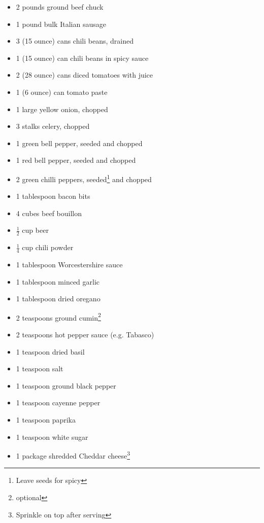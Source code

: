 \documentclass[12pt]{article}
\begin{document}
\vspace{-3cm}
\begin{itemize}
  \item 2 pounds ground beef chuck 
  \item 1 pound bulk Italian sausage 
  \item 3 (15 ounce) cans chili beans, drained 
  \item 1 (15 ounce) can chili beans in spicy sauce 
  \item 2 (28 ounce) cans diced tomatoes with juice 
  \item 1 (6 ounce) can tomato paste 
  \item 1 large yellow onion, chopped 
  \item 3 stalks celery, chopped 
  \item 1 green bell pepper, seeded and chopped 
  \item 1 red bell pepper, seeded and chopped 
  \item 2 green chilli peppers, seeded\footnote{Leave seeds for spicy} and chopped 
  \item 1 tablespoon bacon bits 
  \item 4 cubes beef bouillon 
  \item $\frac{1}{2}$ cup beer 
  \item $\frac{1}{4}$ cup chili powder 
  \item 1 tablespoon Worcestershire sauce 
  \item 1 tablespoon minced garlic 
  \item 1 tablespoon dried oregano 
  \item 2 teaspoons ground cumin\footnote{optional}
  \item 2 teaspoons hot pepper sauce (e.g. Tabasco)
  \item 1 teaspoon dried basil 
  \item 1 teaspoon salt 
  \item 1 teaspoon ground black pepper 
  \item 1 teaspoon cayenne pepper 
  \item 1 teaspoon paprika 
  \item 1 teaspoon white sugar
  \item 1 package shredded Cheddar cheese\footnote{Sprinkle on top after serving}
\end{itemize}
\end{document}
